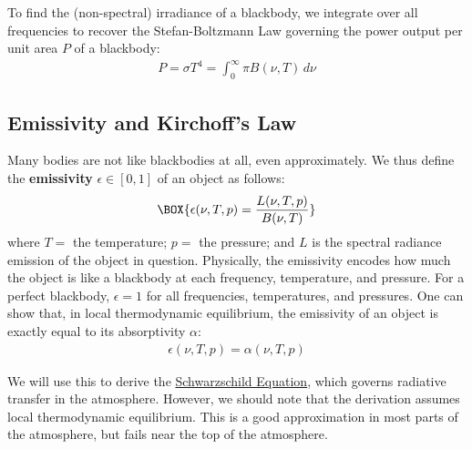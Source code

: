 To find the (non-spectral) irradiance of a blackbody, we integrate over all frequencies to recover the Stefan-Boltzmann Law governing the power output per unit area $P$ of a blackbody:
\begin{align}\label{Blackbody Frequency}
    \boxed{P=\sigma T^4=\int_0^\infty \pi B(\nu,T)\,d\nu}
\end{align}
\subsection{Emissivity and Kirchoff's Law}

Many bodies are not like blackbodies at all, even approximately. We thus define the \textbf{emissivity} $\epsilon\in[0,1]$ of an object as follows:
\begin{align}
    \BOX{\epsilon(\nu,T,p)=\frac{L(\nu,T,p)}{B(\nu,T)}}
\end{align}
where $T=$ the temperature; $p=$ the pressure; and $L$ is the spectral radiance emission of the object in question. Physically, the emissivity encodes how much the object is like a blackbody at each frequency, temperature, and pressure. For a perfect blackbody, $\epsilon=1$ for all frequencies, temperatures, and pressures. One can show that, in local thermodynamic equilibrium, the emissivity of an object is exactly equal to its absorptivity $\alpha$:
\begin{align}
    \boxed{\epsilon(\nu,T,p)=\alpha(\nu,T,p)}
\end{align}

We will use this to derive the \hyperref[Schwarzschild]{Schwarzschild Equation}, which governs radiative transfer in the atmosphere. However, we should note that the derivation assumes local thermodynamic equilibrium. This is a good approximation in most parts of the atmosphere, but fails near the top of the atmosphere.

